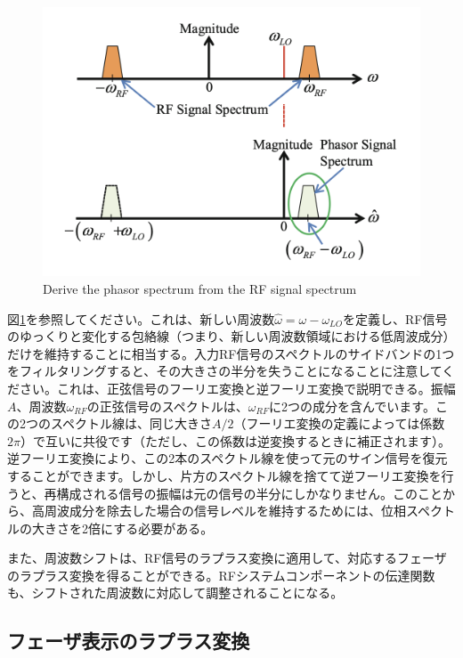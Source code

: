 \documentclass[book]{jlreq}
\begin{document}
%
\begin{figure}[hbt]
    \begin{center}
      \includegraphics[width=12cm,clip]{figs/Fig3.4.png}
      \caption{Derive the phasor spectrum from the RF signal spectrum}
     \label{Fig3.4}
    \end{center}
\end{figure}
%
図\ref{Fig3.4}を参照してください。これは、新しい周波数$\hat{\omega}=\omega - \omega_{LO}$を定義し、RF信号のゆっくりと変化する包絡線（つまり、新しい周波数領域における低周波成分）だけを維持することに相当する。入力RF信号のスペクトルのサイドバンドの1つをフィルタリングすると、その大きさの半分を失うことになることに注意してください。これは、正弦信号のフーリエ変換と逆フーリエ変換で説明できる。振幅$A$、周波数$\omega_{RF}$の正弦信号のスペクトルは、$\omega_{RF}$に2つの成分を含んでいます。この2つのスペクトル線は、同じ大きさ$A/2$（フーリエ変換の定義によっては係数$2\pi$）で互いに共役です（ただし、この係数は逆変換するときに補正されます）。逆フーリエ変換により、この2本のスペクトル線を使って元のサイン信号を復元することができます。しかし、片方のスペクトル線を捨てて逆フーリエ変換を行うと、再構成される信号の振幅は元の信号の半分にしかなりません。このことから、高周波成分を除去した場合の信号レベルを維持するためには、位相スペクトルの大きさを2倍にする必要がある。

また、周波数シフトは、RF信号のラプラス変換に適用して、対応するフェーザのラプラス変換を得ることができる。RFシステムコンポーネントの伝達関数も、シフトされた周波数に対応して調整されることになる。

\subsection{フェーザ表示のラプラス変換}
\end{document}
